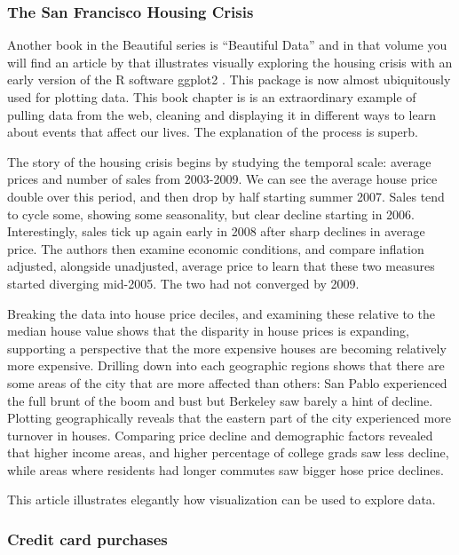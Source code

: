 \documentclass{article}
\begin{document}
\subsubsection{The San Francisco Housing Crisis}

Another book in the Beautiful series is ``Beautiful Data'' and in that volume you will find an article by \citet{SFHousing} that illustrates visually exploring the housing crisis with an early version of the R software ggplot2 \citep{wickham2009ggplot2}. This package is now almost ubiquitously used for plotting data. This book chapter is is an extraordinary example of pulling data from the web, cleaning and displaying it in different ways to learn about events that affect our lives. The explanation of the process is superb.

The story of the housing crisis begins by studying the temporal scale: average prices and number of sales from 2003-2009. We can see the average house price double over this period, and then drop by half starting summer 2007. Sales tend to cycle some, showing some seasonality, but clear decline starting in 2006. Interestingly, sales tick up again early in 2008 after sharp declines in average price. The authors then examine economic conditions, and compare inflation adjusted,  alongside unadjusted, average price to learn that these two measures started diverging mid-2005. The two had not converged by 2009.

Breaking the data into house price deciles, and examining these relative to the median house value shows that the disparity in house prices is expanding, supporting a perspective that the more expensive houses are becoming relatively more expensive. Drilling down into each geographic regions shows that there are some areas of the city that are more affected than others: San Pablo experienced the full brunt of the boom and bust but Berkeley saw barely a hint of decline. Plotting  geographically  reveals that the eastern part of the city experienced more turnover in houses. Comparing price decline and demographic factors revealed that higher income areas, and higher percentage of college grads saw less decline, while areas where residents had longer commutes saw bigger hose price declines.

This article illustrates elegantly how visualization can be used to explore data.

\subsubsection{Credit card purchases}
\end{document}
